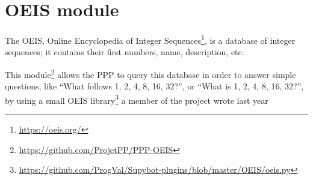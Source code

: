\section{OEIS module}

The OEIS, Online Encyclopedia of Integer Sequences\footnote{\url{https://oeis.org/}}, is a database of integer
sequences; it contains their first numbers, name, description, etc.

This module\footnote{\url{https://github.com/ProjetPP/PPP-OEIS}} allows the
PPP to query this database in order to answer simple questions, like
“What follows 1, 2, 4, 8, 16, 32?”, or “What is 1, 2, 4, 8, 16, 32?”,
by using a small OEIS library\footnote{\url{https://github.com/ProgVal/Supybot-plugins/blob/master/OEIS/oeis.py}}
a member of the project wrote last year
